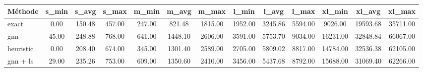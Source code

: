 \begin{tabular}{lcccccccccccc}
\toprule
Méthode & s_min & s_avg & s_max & m_min & m_avg & m_max & l_min & l_avg & l_max & xl_min & xl_avg & xl_max \\
\midrule
exact & 0.00 & 150.48 & 457.00 & 247.00 & 821.48 & 1815.00 & 1952.00 & 3245.86 & 5594.00 & 9026.00 & 19593.68 & 35711.00 \\
gnn & 45.00 & 248.88 & 768.00 & 641.00 & 1448.10 & 2606.00 & 3591.00 & 5753.70 & 9034.00 & 16231.00 & 32848.84 & 66067.00 \\
heuristic & 0.00 & 208.40 & 674.00 & 345.00 & 1301.40 & 2589.00 & 2705.00 & 5809.02 & 8817.00 & 14784.00 & 32536.38 & 62105.00 \\
gnn + ls & 29.00 & 235.26 & 753.00 & 609.00 & 1350.60 & 2410.00 & 3456.00 & 5437.68 & 8792.00 & 15688.00 & 31069.40 & 62266.00 \\
\bottomrule
\end{tabular}
